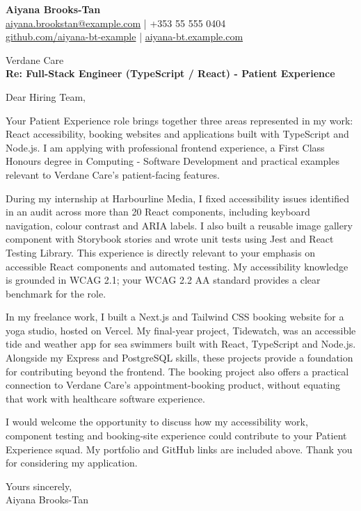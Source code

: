 \documentclass[11pt,a4paper]{article}
\begin{document}
{\large\bfseries\color{primarycolor} Aiyana Brooks-Tan}\\
\href{mailto:aiyana.brookstan@example.com}{aiyana.brookstan@example.com} | +353 55 555 0404\\
\href{https://github.com/aiyana-bt-example}{github.com/aiyana-bt-example} | \href{https://aiyana-bt.example.com}{aiyana-bt.example.com}

Verdane Care\\
\textbf{Re: Full-Stack Engineer (TypeScript / React) - Patient Experience}

Dear Hiring Team,

Your Patient Experience role brings together three areas represented in my work: React accessibility, booking websites and applications built with TypeScript and Node.js. I am applying with professional frontend experience, a First Class Honours degree in Computing - Software Development and practical examples relevant to Verdane Care's patient-facing features.

During my internship at Harbourline Media, I fixed accessibility issues identified in an audit across more than 20 React components, including keyboard navigation, colour contrast and ARIA labels. I also built a reusable image gallery component with Storybook stories and wrote unit tests using Jest and React Testing Library. This experience is directly relevant to your emphasis on accessible React components and automated testing. My accessibility knowledge is grounded in WCAG 2.1; your WCAG 2.2 AA standard provides a clear benchmark for the role.

In my freelance work, I built a Next.js and Tailwind CSS booking website for a yoga studio, hosted on Vercel. My final-year project, Tidewatch, was an accessible tide and weather app for sea swimmers built with React, TypeScript and Node.js. Alongside my Express and PostgreSQL skills, these projects provide a foundation for contributing beyond the frontend. The booking project also offers a practical connection to Verdane Care's appointment-booking product, without equating that work with healthcare software experience.

I would welcome the opportunity to discuss how my accessibility work, component testing and booking-site experience could contribute to your Patient Experience squad. My portfolio and GitHub links are included above. Thank you for considering my application.

Yours sincerely,\\
Aiyana Brooks-Tan
\end{document}
